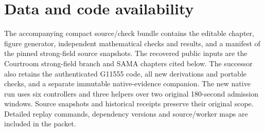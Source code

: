 \documentclass[10pt,twocolumn,letterpaper]{article}
\begin{document}
\section*{Data and code availability}
The accompanying compact source/check bundle contains the editable
chapter, figure generator, independent mathematical checks and results,
and a manifest of the pinned strong-field source snapshots. The
recovered public inputs are the Courtroom strong-field branch and SAMA
chapters cited below. The successor also retains the authenticated G11555 code, all new derivations and portable checks, and a separate immutable native-evidence companion. The new native run uses six controllers and three helpers over two original 180-second admission windows. Source snapshots and historical receipts preserve their original scope. Detailed replay commands, dependency versions and source/worker maps are included in the packet.
\end{document}
